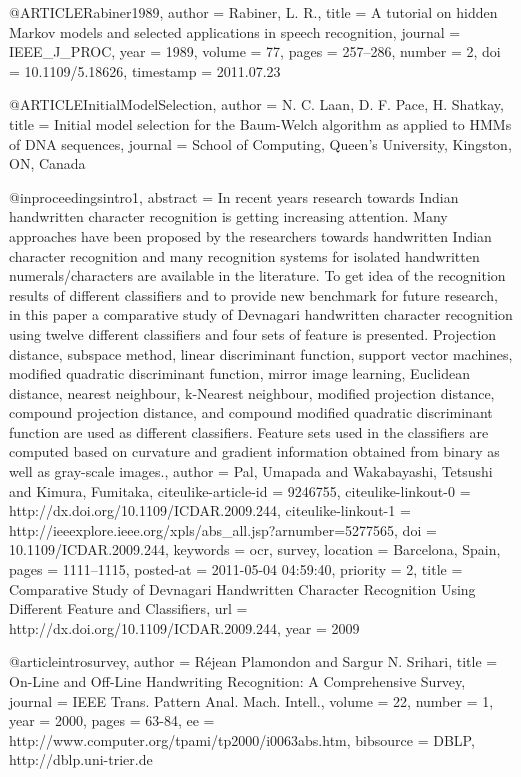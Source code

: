 

@ARTICLE{Rabiner1989,
  author = {Rabiner, L. R.},
  title = {A tutorial on hidden Markov models and selected applications in speech
	recognition},
  journal = IEEE_J_PROC,
  year = {1989},
  volume = {77},
  pages = {257--286},
  number = {2},
  doi = {10.1109/5.18626},
  timestamp = {2011.07.23}
}

@ARTICLE{InitialModelSelection,
  author = {N. C. Laan, D. F. Pace, H. Shatkay},
  title = {Initial model selection for the Baum-Welch algorithm as applied to HMMs of DNA sequences},
  journal = {School of Computing, Queen’s University, Kingston, ON, Canada}
}


@inproceedings{intro1,
    abstract = {{In recent years research towards Indian handwritten character recognition is getting increasing attention. Many approaches have been proposed by the researchers towards handwritten Indian character recognition and many recognition systems for isolated handwritten numerals/characters are available in the literature. To get idea of the recognition results of different classifiers and to provide new benchmark for future research, in this paper a comparative study of Devnagari handwritten character recognition using twelve different classifiers and four sets of feature is presented. Projection distance, subspace method, linear discriminant function, support vector machines, modified quadratic discriminant function, mirror image learning, Euclidean distance, nearest neighbour, k-Nearest neighbour, modified projection distance, compound projection distance, and compound modified quadratic discriminant function are used as different classifiers. Feature sets used in the classifiers are computed based on curvature and gradient information obtained from binary as well as gray-scale images.}},
    author = {Pal, Umapada and Wakabayashi, Tetsushi and Kimura, Fumitaka},
    citeulike-article-id = {9246755},
    citeulike-linkout-0 = {http://dx.doi.org/10.1109/ICDAR.2009.244},
    citeulike-linkout-1 = {http://ieeexplore.ieee.org/xpls/abs\_all.jsp?arnumber=5277565},
    doi = {10.1109/ICDAR.2009.244},
    keywords = {ocr, survey},
    location = {Barcelona, Spain},
    pages = {1111--1115},
    posted-at = {2011-05-04 04:59:40},
    priority = {2},
    title = {{Comparative Study of Devnagari Handwritten Character Recognition Using Different Feature and Classifiers}},
    url = {http://dx.doi.org/10.1109/ICDAR.2009.244},
    year = {2009}
}

@article{introsurvey,
  author    = {R{\'e}jean Plamondon and
               Sargur N. Srihari},
  title     = {On-Line and Off-Line Handwriting Recognition: A Comprehensive
               Survey},
  journal   = {IEEE Trans. Pattern Anal. Mach. Intell.},
  volume    = {22},
  number    = {1},
  year      = {2000},
  pages     = {63-84},
  ee        = {http://www.computer.org/tpami/tp2000/i0063abs.htm},
  bibsource = {DBLP, http://dblp.uni-trier.de}
}

